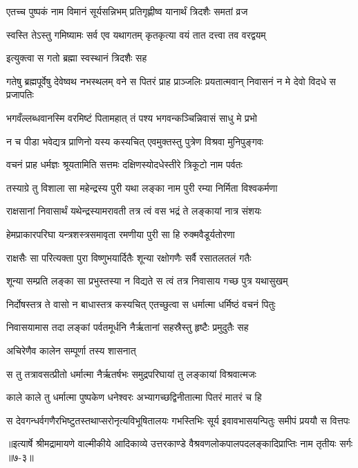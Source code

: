 \twolineshloka
{एतच्च पुष्पकं नाम विमानं सूर्यसन्निभम्}
{प्रतिगृह्णीष्व यानार्थं त्रिदशैः समतां व्रज} %

\twolineshloka
{स्वस्ति तेऽस्तु गमिष्यामः सर्व एव यथागतम्}
{कृतकृत्या वयं तात दत्त्वा तव वरद्वयम्} %

\onelineshloka
{इत्युक्त्वा स गतो ब्रह्मा स्वस्थानं त्रिदशैः सह} %

\threelineshloka
{गतेषु ब्रह्मपूर्वेषु देवेष्वथ नभस्थलम्}
{वने स पितरं प्राह प्राञ्जलिः प्रयतात्मवान्}
{निवासनं न मे देवो विदधे स प्रजापतिः} %

\twolineshloka
{भगवँल्लब्धवानस्मि वरमिष्टं पितामहात्}
{तं पश्य भगवन्कञ्चिन्निवासं साधु मे प्रभो} %

\twolineshloka
{न च पीडा भवेद्यत्र प्राणिनो यस्य कस्यचित्}
{एवमुक्तस्तु पुत्रेण विश्रवा मुनिपुङ्गवः} %

\twolineshloka
{वचनं प्राह धर्मज्ञः श्रूयतामिति सत्तमः}
{दक्षिणस्योदधेस्तीरे त्रिकूटो नाम पर्वतः} %

\twolineshloka
{तस्याग्रे तु विशाला सा महेन्द्रस्य पुरी यथा}
{लङ्का नाम पुरी रम्या निर्मिता विश्वकर्मणा} %

\twolineshloka
{राक्षसानां निवासार्थं यथेन्द्रस्यामरावती}
{तत्र त्वं वस भद्रं ते लङ्कायां नात्र संशयः} %

\twolineshloka
{हेमप्राकारपरिघा यन्त्रशस्त्रसमावृता}
{रमणीया पुरी सा हि रुक्मवैडूर्यतोरणा} %

\twolineshloka
{राक्षसैः सा परित्यक्ता पुरा विष्णुभयार्दितैः}
{शून्या रक्षोगणैः सर्वै रसातलतलं गतैः} %

\twolineshloka
{शून्या सम्प्रति लङ्का सा प्रभुस्तस्या न विद्यते}
{स त्वं तत्र निवासाय गच्छ पुत्र यथासुखम्} %

\twolineshloka
{निर्दोषस्तत्र ते वासो न बाधास्तत्र कस्यचित्}
{एतच्छुत्वा स धर्मात्मा धर्मिष्ठं वचनं पितुः} %

\twolineshloka
{निवासयामास तदा लङ्कां पर्वतमूर्धनि}
{नैर्ऋतानां सहस्रैस्तु हृष्टैः प्रमुदुतैः सह} %

\onelineshloka
{अचिरेणैव कालेन सम्पूर्णा तस्य शासनात्} %

\twolineshloka
{स तु तत्रावसत्प्रीतो धर्मात्मा नैर्ऋतर्षभः}
{समुद्रपरिघायां तु लङ्कायां विश्रवात्मजः} %

\twolineshloka
{काले काले तु धर्मात्मा पुष्पकेण धनेश्वरः}
{अभ्यागच्छद्विनीतात्मा पितरं मातरं च हि} %

\twolineshloka
{स देवगन्धर्वगणैरभिष्टुतस्तथाप्सरोनृत्यविभूषितालयः}
{गभस्तिभिः सूर्य इवावभासयन्पितुः समीपं प्रययौ स वित्तपः} %


॥इत्यार्षे श्रीमद्रामायणे वाल्मीकीये आदिकाव्ये उत्तरकाण्डे वैश्रवणलोकपालपदलङ्कादिप्राप्तिः नाम तृतीयः सर्गः ॥७-३॥
